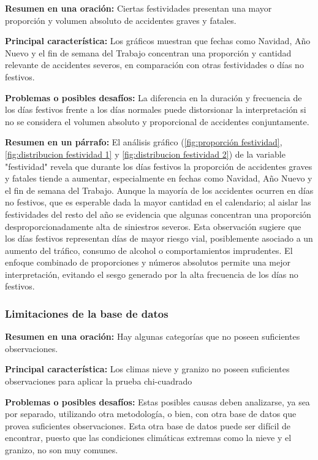 \documentclass{book}
\begin{document}
\textbf{Resumen en una oración:} Ciertas festividades presentan una mayor proporción y volumen absoluto de accidentes graves y fatales.

\textbf{Principal característica:} Los gráficos muestran que fechas como Navidad, Año Nuevo y el fin de semana del Trabajo concentran una proporción y cantidad relevante de accidentes severos, en comparación con otras festividades o días no festivos.

\textbf{Problemas o posibles desafíos:} La diferencia en la duración y frecuencia de los días festivos frente a los días normales puede distorsionar la interpretación si no se considera el volumen absoluto y proporcional de accidentes conjuntamente.

\textbf{Resumen en un párrafo:} El análisis gráfico (\ref{fig:proporción festividad}, \ref{fig:distribucion festividad 1} y \ref{fig:distribucion festividad 2}) de la variable "festividad" revela que durante los días festivos la proporción de accidentes graves y fatales tiende a aumentar, especialmente en fechas como Navidad, Año Nuevo y el fin de semana del Trabajo. Aunque la mayoría de los accidentes ocurren en días no festivos, que es esperable dada la mayor cantidad en el calendario; al aislar las festividades del resto del año se evidencia que algunas concentran una proporción desproporcionadamente alta de siniestros severos. Esta observación sugiere que los días festivos representan días de mayor riesgo vial, posiblemente asociado a un aumento del tráfico, consumo de alcohol o comportamientos imprudentes. El enfoque combinado de proporciones y números absolutos permite una mejor interpretación, evitando el sesgo generado por la alta frecuencia de los días no festivos.



\subsubsection{Limitaciones de la base de datos}
\textbf{Resumen en una oración:} Hay algunas categorías que no poseen suficientes observaciones.

\textbf{Principal característica:} Los climas nieve y granizo no poseen suficientes observaciones para aplicar la prueba chi-cuadrado

\textbf{Problemas o posibles desafíos:} Estas posibles causas deben analizarse, ya sea por separado, utilizando otra metodología, o bien, con otra base de datos que provea suficientes observaciones. Esta otra base de datos puede ser difícil de encontrar, puesto que las condiciones climáticas extremas como la nieve y el granizo, no son muy comunes.
\end{document}
